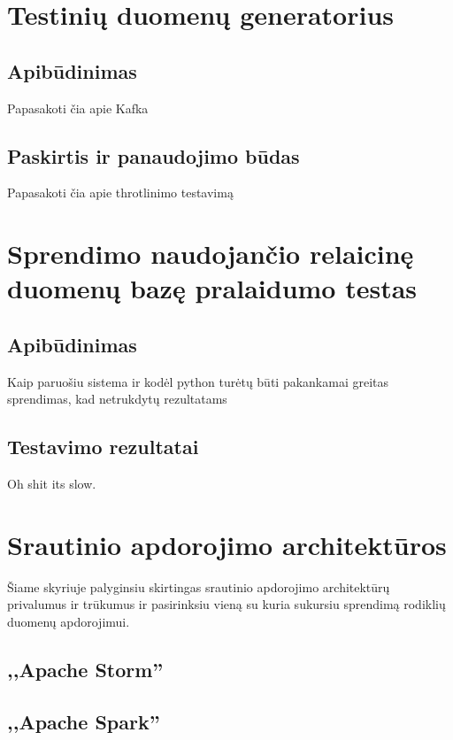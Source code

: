 \documentclass{VUMIFPSkursinis}
\begin{document}
\section{Testinių duomenų generatorius}

\subsection{Apibūdinimas}

Papasakoti čia apie Kafka

\subsection{Paskirtis ir panaudojimo būdas}

Papasakoti čia apie throtlinimo testavimą

\section{Sprendimo naudojančio relaicinę duomenų bazę pralaidumo testas}

\subsection{Apibūdinimas}

Kaip paruošiu sistema ir kodėl python turėtų būti pakankamai greitas sprendimas, kad netrukdytų rezultatams

\subsection{Testavimo rezultatai}

Oh shit its slow.

\section{Srautinio apdorojimo architektūros} \label{srautarch}
Šiame skyriuje palyginsiu skirtingas srautinio apdorojimo architektūrų privalumus ir trūkumus ir pasirinksiu vieną su kuria sukursiu sprendimą rodiklių duomenų apdorojimui.
\subsection{,,Apache Storm''}

\subsection{,,Apache Spark''}
\end{document}
